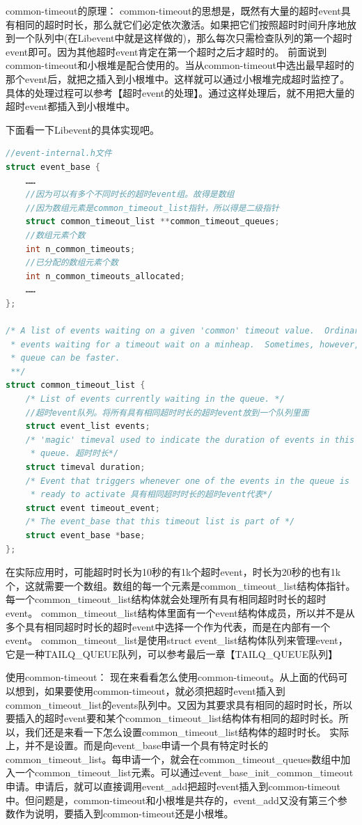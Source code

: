 \documentclass[11pt,a4paper]{article}
\begin{document}
common-timeout的原理：
        common-timeout的思想是，既然有大量的超时event具有相同的超时时长，那么就它们必定依次激活。如果把它们按照超时时间升序地放到一个队列中(在Libevent中就是这样做的)，那么每次只需检查队列的第一个超时event即可。因为其他超时event肯定在第一个超时之后才超时的。
        前面说到common-timeout和小根堆是配合使用的。当从common-timeout中选出最早超时的那个event后，就把之插入到小根堆中。这样就可以通过小根堆完成超时监控了。具体的处理过程可以参考【超时event的处理】。通过这样处理后，就不用把大量的超时event都插入到小根堆中。

        下面看一下Libevent的具体实现吧。

\begin{lstlisting}[language=C]
//event-internal.h文件
struct event_base {
	……
	//因为可以有多个不同时长的超时event组。故得是数组
	//因为数组元素是common_timeout_list指针，所以得是二级指针
	struct common_timeout_list **common_timeout_queues;
	//数组元素个数
	int n_common_timeouts;
	//已分配的数组元素个数
	int n_common_timeouts_allocated;
	……
};

/* A list of events waiting on a given 'common' timeout value.  Ordinarily,
 * events waiting for a timeout wait on a minheap.  Sometimes, however, a
 * queue can be faster.
 **/
struct common_timeout_list {
	/* List of events currently waiting in the queue. */
	//超时event队列。将所有具有相同超时时长的超时event放到一个队列里面
	struct event_list events;
	/* 'magic' timeval used to indicate the duration of events in this
	 * queue. 超时时长*/
	struct timeval duration;
	/* Event that triggers whenever one of the events in the queue is
	 * ready to activate 具有相同超时时长的超时event代表*/
	struct event timeout_event;
	/* The event_base that this timeout list is part of */
	struct event_base *base;
};
\end{lstlisting}
在实际应用时，可能超时时长为10秒的有1k个超时event，时长为20秒的也有1k个，这就需要一个数组。数组的每一个元素是common\_timeout\_list结构体指针。每一个common\_timeout\_list结构体就会处理所有具有相同超时时长的超时event。
        common\_timeout\_list结构体里面有一个event结构体成员，所以并不是从多个具有相同超时时长的超时event中选择一个作为代表，而是在内部有一个event。
        common\_timeout\_list是使用struct  event\_list结构体队列来管理event，它是一种TAILQ\_QUEUE队列，可以参考最后一章【TAILQ\_QUEUE队列】
        
使用common-timeout：
        现在来看看怎么使用common-timeout。从上面的代码可以想到，如果要使用common-timeout，就必须把超时event插入到common\_timeout\_list的events队列中。又因为其要求具有相同的超时时长，所以要插入的超时event要和某个common\_timeout\_list结构体有相同的超时时长。所以，我们还是来看一下怎么设置common\_timeout\_list结构体的超时时长。
        实际上，并不是设置。而是向event\_base申请一个具有特定时长的common\_timeout\_list。每申请一个，就会在common\_timeout\_queues数组中加入一个common\_timeout\_list元素。可以通过event\_base\_init\_common\_timeout申请。申请后，就可以直接调用event\_add把超时event插入到common-timeout中。但问题是，common-timeout和小根堆是共存的，event\_add又没有第三个参数作为说明，要插入到common-timeout还是小根堆。
\end{document}
